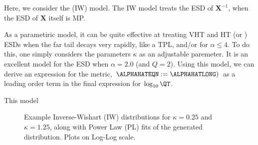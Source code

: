 Here, we consider the \InverseWishart (IW) model.
The IW model treats the ESD of $\mathbf{X}^{-1}$, when the ESD of $\mathbf{X}$ itself is MP.

As a parametiric model, it can be quite effective at treating VHT and HT (or \FatTailed) ESDs when the far tail decays very rapidly, like a TPL, and/or for $\alpha\le 4$.
To do this, one simply considers the parameters $\kappa$ as an adjustable paremeter.
%
It is an excellent model for the ESD when $\alpha=2.0$ (and $Q=2$).
Using this model, we can derive an expression for the \HTSR \ALPHAHAT \LayerQuality metric,
$\ALPHAHATEQN :=\ALPHAHATLONG)$ as a leading order term in the final expression for $\log_{10}\QT$.

This model 


\begin{figure}[h]
    \centering
      \caption{Example Inverse-Wishart (IW) distributions for $\kappa=0.25$ and $\kappa=1.25$,  along with Power Law (PL) fits of the generated distribution. Plots on Log-Log scale.}
  \label{fig:IWplots}                                                                                                      
\end{figure}   

